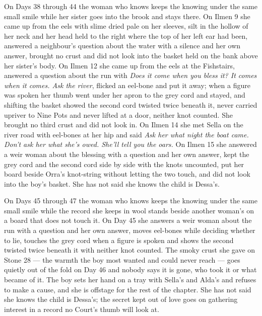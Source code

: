 \documentclass{design/chronicle}
\begin{document}
{On Days 38 through 44 the woman who knows keeps the knowing under the same small smile while her sister goes into the brook and stays there. On Ilmen 9 she came up from the eels with slime dried pale on her sleeves, silt in the hollow of her neck and her head held to the right where the top of her left ear had been, answered a neighbour’s question about the water with a silence and her own answer, brought no crust and did not look into the basket held on the bank above her sister’s body. On Ilmen 12 she came up from the eels at the Fishstairs, answered a question about the run with \emph{Does it come when you bless it? It comes when it comes. Ask the river}, flicked an eel-bone and put it away; when a figure was spoken her thumb went under her apron to the grey cord and stayed, and shifting the basket showed the second cord twisted twice beneath it, never carried upriver to Nine Pots and never lifted at a door, neither knot counted. She brought no third crust and did not look in. On Ilmen 14 she met Sella on the river road with eel-bones at her hip and said \emph{Ask her what night the boat came. Don’t ask her what she’s owed. She’ll tell you the oars.} On Ilmen 15 she answered a weir woman about the blessing with a question and her own answer, kept the grey cord and the second cord side by side with the knots uncounted, put her board beside Orra’s knot-string without letting the two touch, and did not look into the boy’s basket. She has not said she knows the child is Dessa’s.

On Days 45 through 47 the woman who knows keeps the knowing under the same small smile while the record she keeps in wool stands beside another woman’s on a board that does not touch it. On Day 45 she answers a weir woman about the run with a question and her own answer, moves eel-bones while deciding whether to lie, touches the grey cord when a figure is spoken and shows the second twisted twice beneath it with neither knot counted. The smoky crust she gave on Stone 28 --- the warmth the boy most wanted and could never reach --- goes quietly out of the fold on Day 46 and nobody says it is gone, who took it or what became of it. The boy sets her hand on a tray with Sella’s and Alda’s and refuses to make a cause, and she is offstage for the rest of the chapter. She has not said she knows the child is Dessa’s; the secret kept out of love goes on gathering interest in a record no Court’s thumb will look at.

}
\end{document}
